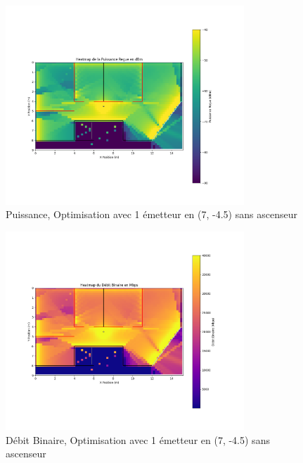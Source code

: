 \begin{figure}[H]
    \centering
    \includegraphics[width=0.8\textwidth]{Pictures/opt1bpm.png}
    \caption{Puissance, Optimisation avec 1 émetteur en (7, -4.5) sans ascenseur}
    \label{opti1dbm}
\end{figure}
\begin{figure}[H]
    \centering
    \includegraphics[width=0.8\textwidth]{Pictures/opti1mbps.png}
    \caption{Débit Binaire, Optimisation avec 1 émetteur en (7, -4.5) sans ascenseur}
    \label{opti1mbps}
\end{figure}
